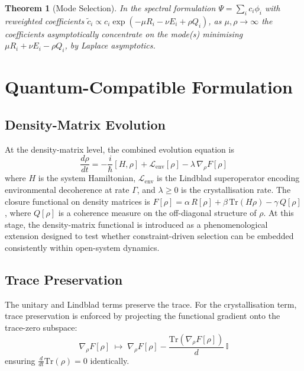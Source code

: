 \documentclass[12pt]{article}
\newtheorem{theorem}{Theorem}
\begin{document}
\begin{theorem}[Mode Selection]
In the spectral formulation $\Psi = \sum_i c_i \phi_i$ with reweighted coefficients $\tilde{c}_i \propto c_i \exp(-\mu R_i - \nu E_i + \rho Q_i)$, as $\mu, \rho \to \infty$ the coefficients asymptotically concentrate on the mode(s) minimising $\mu R_i + \nu E_i - \rho Q_i$, by Laplace asymptotics.
\end{theorem}

\section{Quantum-Compatible Formulation}

\subsection{Density-Matrix Evolution}

At the density-matrix level, the combined evolution equation is
\begin{equation}\label{eq:master}
\frac{d\rho}{dt} = -\frac{i}{\hbar}[H, \rho] + \mathcal{L}_{\mathrm{env}}[\rho] - \lambda\, \nabla_\rho F[\rho]
\end{equation}
where $H$ is the system Hamiltonian, $\mathcal{L}_{\mathrm{env}}$ is the Lindblad superoperator encoding environmental decoherence at rate $\Gamma$, and $\lambda \geq 0$ is the crystallisation rate. The closure functional on density matrices is $F[\rho] = \alpha\, R[\rho] + \beta\, \mathrm{Tr}(H\rho) - \gamma\, Q[\rho]$, where $Q[\rho]$ is a coherence measure on the off-diagonal structure of $\rho$. At this stage, the density-matrix functional is introduced as a phenomenological extension designed to test whether constraint-driven selection can be embedded consistently within open-system dynamics.

\subsection{Trace Preservation}

The unitary and Lindblad terms preserve the trace. For the crystallisation term, trace preservation is enforced by projecting the functional gradient onto the trace-zero subspace:
\begin{equation}
\nabla_\rho F[\rho] \;\mapsto\; \nabla_\rho F[\rho] - \frac{\mathrm{Tr}(\nabla_\rho F[\rho])}{d}\, \mathbb{I}
\end{equation}
ensuring $\frac{d}{dt}\mathrm{Tr}(\rho) = 0$ identically.
\end{document}
